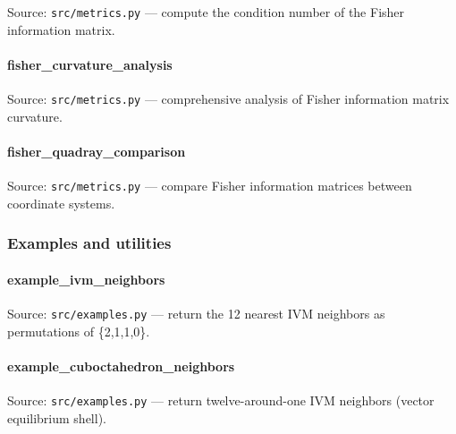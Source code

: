 \documentclass[
  10pt,
]{article}
\newcommand{\passthrough}[1]{#1}
\renewcommand{\texttt}[1]{%
    \colorbox{codebg}{\color{codefg}\ttfamily #1}%
}
\begin{document}
Source: \passthrough{\lstinline!src/metrics.py!} --- compute the
condition number of the Fisher information matrix.

\hypertarget{code:fisher_curvature_analysis}{%
\paragraph{\texorpdfstring{\texttt{fisher\_curvature\_analysis}}{fisher\_curvature\_analysis}}\label{code:fisher_curvature_analysis}}

Source: \passthrough{\lstinline!src/metrics.py!} --- comprehensive
analysis of Fisher information matrix curvature.

\hypertarget{code:fisher_quadray_comparison}{%
\paragraph{\texorpdfstring{\texttt{fisher\_quadray\_comparison}}{fisher\_quadray\_comparison}}\label{code:fisher_quadray_comparison}}

Source: \passthrough{\lstinline!src/metrics.py!} --- compare Fisher
information matrices between coordinate systems.

\hypertarget{code:examples}{%
\subsubsection{Examples and utilities}\label{code:examples}}

\hypertarget{code:example_ivm_neighbors}{%
\paragraph{\texorpdfstring{\texttt{example\_ivm\_neighbors}}{example\_ivm\_neighbors}}\label{code:example_ivm_neighbors}}

Source: \passthrough{\lstinline!src/examples.py!} --- return the 12
nearest IVM neighbors as permutations of \{2,1,1,0\}.

\hypertarget{code:example_cuboctahedron_neighbors}{%
\paragraph{\texorpdfstring{\texttt{example\_cuboctahedron\_neighbors}}{example\_cuboctahedron\_neighbors}}\label{code:example_cuboctahedron_neighbors}}

Source: \passthrough{\lstinline!src/examples.py!} --- return
twelve-around-one IVM neighbors (vector equilibrium shell).
\end{document}
